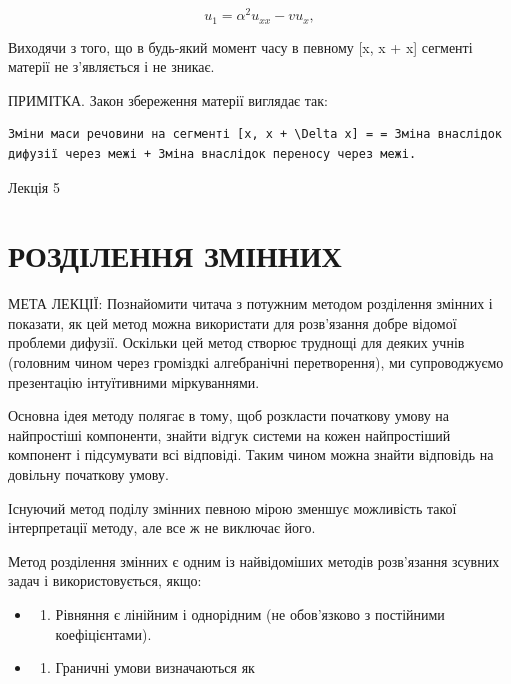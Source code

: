 \documentclass[
  ukrainian,
]{article}
\providecommand{\tightlist}{%
  \setlength{\itemsep}{0pt}\setlength{\parskip}{0pt}}
\begin{document}
\[
u_1 = \alpha^2 u_{xx} - v u_x,
\]

Виходячи з того, що в будь-який момент часу в певному {[}x, x +
\Delta x{]} сегменті матерії не з'являється і не зникає.

ПРИМІТКА. Закон збереження матерії виглядає так:

\begin{verbatim}
Зміни маси речовини на сегменті [x, x + \Delta x] = = Зміна внаслідок дифузії через межі + Зміна внаслідок переносу через межі.
\end{verbatim}

Лекція 5

\section{РОЗДІЛЕННЯ
ЗМІННИХ}\label{ux440ux43eux437ux434ux456ux43bux435ux43dux43dux44f-ux437ux43cux456ux43dux43dux438ux445}

МЕТА ЛЕКЦІЇ: Познайомити читача з потужним методом розділення змінних і
показати, як цей метод можна використати для розв'язання добре відомої
проблеми дифузії. Оскільки цей метод створює труднощі для деяких учнів
(головним чином через громіздкі алгебранічні перетворення), ми
супроводжуємо презентацію інтуїтивними міркуваннями.

Основна ідея методу полягає в тому, щоб розкласти початкову умову на
найпростіші компоненти, знайти відгук системи на кожен найпростіший
компонент і підсумувати всі відповіді. Таким чином можна знайти
відповідь на довільну початкову умову.

Існуючий метод поділу змінних певною мірою зменшує можливість такої
інтерпретації методу, але все ж не виключає його.

Метод розділення змінних є одним із найвідоміших методів розв'язання
зсувних задач і використовується, якщо:

\begin{itemize}
\tightlist
\item
  \begin{enumerate}
  \def\labelenumi{\arabic{enumi}.}
  \tightlist
  \item
    Рівняння є лінійним і однорідним (не обов'язково з постійними
    коефіцієнтами).
  \end{enumerate}
\item
  \begin{enumerate}
  \def\labelenumi{\arabic{enumi}.}
  \setcounter{enumi}{1}
  \tightlist
  \item
    Граничні умови визначаються як
  \end{enumerate}
\end{itemize}
\end{document}
